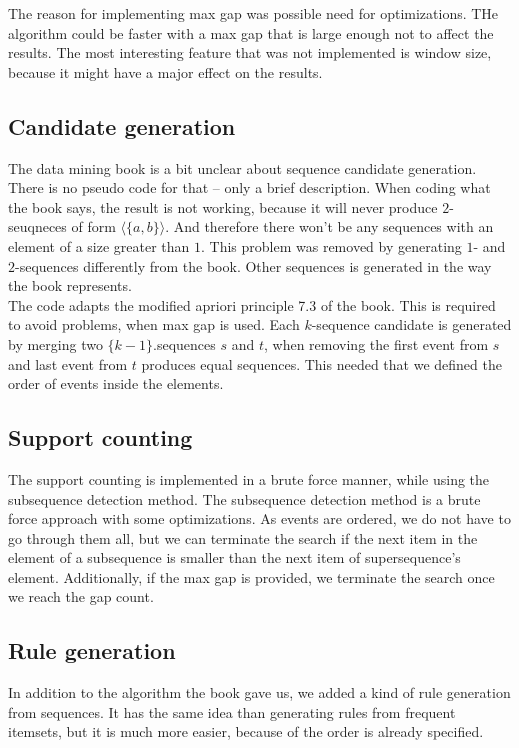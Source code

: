 The reason for implementing max gap was possible need for optimizations. THe algorithm could be faster 
with a max gap that is large enough not to affect the results. The most interesting feature 
that was not implemented is window size, because it might have a major effect on 
the results.

\subsection{Candidate generation}
The data mining book is a bit unclear about sequence candidate generation. There is no pseudo code for that -- only a brief description. When coding what the book says, the result is not working, because it will never produce $2$-seuqneces of form $\langle\{a,b\}\rangle$. And therefore there won't be any sequences with an element of a size greater than $1$. This problem was removed by generating $1$- and $2$-sequences differently from the book. Other sequences is generated in the way the book represents.\\ 

The code adapts the modified apriori principle 7.3 of the book. This is required to avoid problems, when max gap is used. Each $k$-sequence candidate is generated by merging two $\{k-1\}$.sequences $s$ and $t$, when removing the first event from $s$ and last event from $t$ produces equal sequences. This needed that we defined the order of events inside the elements.

\subsection{Support counting}
The support counting is implemented in a brute force manner, while using the subsequence detection method. The subsequence detection method is a brute force approach with some optimizations. As events are ordered, we do not have to go through them all, but we can terminate the search if the next item in the element of a subsequence is smaller than the next item of supersequence’s element. Additionally, if the max gap is provided, we terminate the search once we reach the gap count.

\subsection{Rule generation}
In addition to the algorithm the book gave us, we added a kind of rule generation from sequences. It has the same idea than generating rules from frequent itemsets, but it is much more easier, because of the order is already specified.
